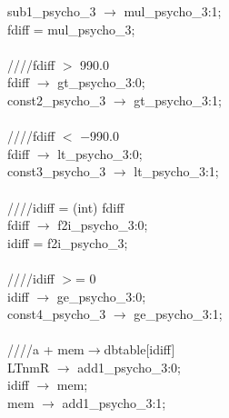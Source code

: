 {   \hspace*{2em}sub1\_psycho\_3 $\rightarrow$ mul\_psycho\_3:1; \\
   \hspace*{2em}fdiff = mul\_psycho\_3; \\
   \\
   \hspace*{2em}////fdiff $>$ 990.0 \\
   \hspace*{2em}fdiff $\rightarrow$ gt\_psycho\_3:0; \\
   \hspace*{2em}const2\_psycho\_3 $\rightarrow$ gt\_psycho\_3:1; \\
   \\
   \hspace*{2em}////fdiff $<$ $-$990.0 \\
   \hspace*{2em}fdiff $\rightarrow$ lt\_psycho\_3:0; \\
   \hspace*{2em}const3\_psycho\_3 $\rightarrow$ lt\_psycho\_3:1; \\
   \\
   \hspace*{2em}////idiff = (int) fdiff \\
   \hspace*{2em}fdiff $\rightarrow$ f2i\_psycho\_3:0; \\
   \hspace*{2em}idiff = f2i\_psycho\_3; \\
   \\
   \hspace*{2em}////idiff $>$= 0 \\
   \hspace*{2em}idiff $\rightarrow$ ge\_psycho\_3:0; \\
   \hspace*{2em}const4\_psycho\_3 $\rightarrow$ ge\_psycho\_3:1; \\
   \\
   \hspace*{2em}////a + mem$\rightarrow$dbtable[idiff] \\
   \hspace*{2em}LTnmR $\rightarrow$ add1\_psycho\_3:0; \\
   \hspace*{2em}idiff $\rightarrow$ mem; \\
   \hspace*{2em}mem $\rightarrow$ add1\_psycho\_3:1; \\
}
